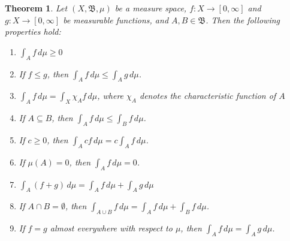 \documentclass[12pt]{article}
\newtheorem*{thm*}{Theorem}
\begin{document}
\begin{thm*}
Let $(X, \mathfrak{B}, \mu)$ be a measure space, $f \colon X \to [0,\infty]$ and $g \colon X \to [0,\infty]$ be measurable functions, and $A,B \in \mathfrak{B}$.  Then the following properties hold:

\begin{enumerate}
\item $\displaystyle \int_A f \, d\mu \ge 0$

\item If $f \le g$, then $\displaystyle \int_A f \, d\mu \le \int_A g \, d\mu$.

\item $\displaystyle \int_A f \, d\mu =\int_X \chi_A f \, d\mu$, where $\chi_A$ denotes the characteristic function of $A$

\item If $A \subseteq B$, then $\displaystyle \int_A f \, d\mu \le \int_B f \, d\mu$.

\item If $c \ge 0$, then $\displaystyle \int_A cf \, d\mu =c\int_A f \, d\mu$.

\item If $\mu(A)=0$, then $\displaystyle \int_A f \, d\mu =0$.

\item $\displaystyle \int_A (f+g) \, d\mu = \int_A f \, d\mu +\int_A g \, d\mu$

\item If $A \cap B=\emptyset$, then $\displaystyle \int_{A \cup B} f \, d\mu =\int_A f \, d\mu +\int_B f \, d\mu$.

\item If $f=g$ almost everywhere with respect to $\mu$, then $\displaystyle \int_A f \, d\mu = \int_A g \, d\mu$.
\end{enumerate}
\end{thm*}
\end{document}
